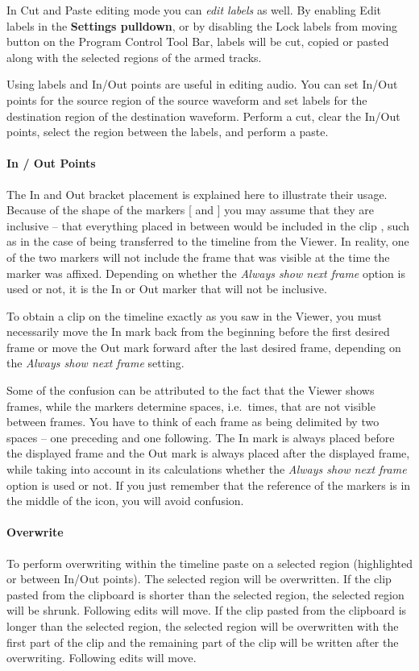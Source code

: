 In Cut and Paste editing mode you can \textit{edit labels}  as
well. By enabling Edit labels in the \textbf{Settings pulldown}, or
by disabling the Lock labels from moving button on the Program
Control Tool Bar, labels will be cut, copied or pasted along with
the selected regions of the armed tracks.

Using labels and In/Out points are useful in editing audio.  You can
set In/Out points for the source region of the source waveform and
set labels for the destination region of the destination
waveform. Perform a cut, clear the In/Out points, select the region
between the labels, and perform a paste.

\paragraph{In / Out Points}  The In and Out bracket placement is
explained here to illustrate their usage.  Because of the shape of
the markers [ and ] you may assume that they are inclusive -- that
everything placed in between would be included in the clip , such as
in the case of being transferred to the timeline from the Viewer.
In reality, one of the two markers will not include the frame that
was visible at the time the marker was affixed. Depending on whether
the \textit{Always show next frame} option is used or not, it is the
In or Out marker that will not be inclusive.

To obtain a clip on the timeline exactly as you saw in the Viewer,
you must necessarily move the In mark back from the beginning before
the first desired frame or move the Out mark forward after the last
desired frame, depending on the \textit{Always show next frame}
setting.

Some of the confusion can be attributed to the fact that the Viewer
shows frames, while the markers determine spaces, i.e.\ times, that
are not visible between frames. You have to think of each frame as
being delimited by two spaces -- one preceding and one following.
The In mark is always placed before the displayed frame and the Out
mark is always placed after the displayed frame, while taking into
account in its calculations whether the \textit{Always show next
  frame }option is used or not. If you just remember that the
reference of the markers is in the middle of the icon, you will
avoid confusion.

\paragraph{Overwrite}  To perform overwriting within the timeline
paste on a selected region (highlighted or between In/Out
points). The selected region will be overwritten. If the clip pasted
from the clipboard is shorter than the selected region, the selected
region will be shrunk. Following edits will move. If the clip pasted
from the clipboard is longer than the selected region, the selected
region will be overwritten with the first part of the clip and the
remaining part of the clip will be written after the
overwriting. Following edits will move.

